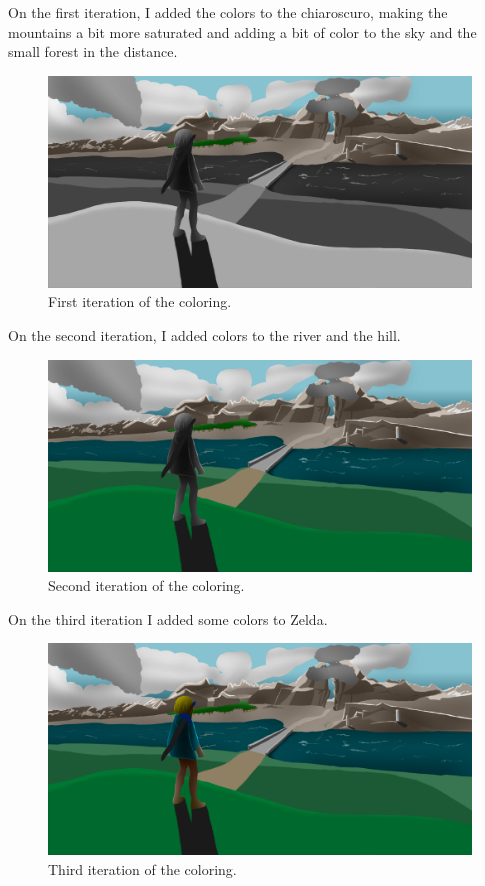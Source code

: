 \documentclass{cup-pan}
\begin{document}
        On the first iteration, I added the colors to the chiaroscuro, making the mountains a bit more saturated and adding a bit of color  to the sky and the small forest in the distance.\\
        \begin{figure}[H]
            \includegraphics[width=\textwidth]{Imagenes/Fanart1/Color/I_Iteracion.png}
            \caption{First iteration of the coloring.}
        \end{figure}
        
        On the second iteration, I added colors to the river and the hill. 
        \begin{figure}[H]
            \includegraphics[width=\textwidth]{Imagenes/Fanart1/Color/II_Iteracion.png}
            \caption{Second iteration of the coloring.}
        \end{figure}

        On the third iteration I added some colors to Zelda. 
        \begin{figure}[H]
            \includegraphics[width=\textwidth]{Imagenes/Fanart1/Color/III_Iteracion.png}
            \caption{Third iteration of the coloring.}
        \end{figure}
\end{document}
